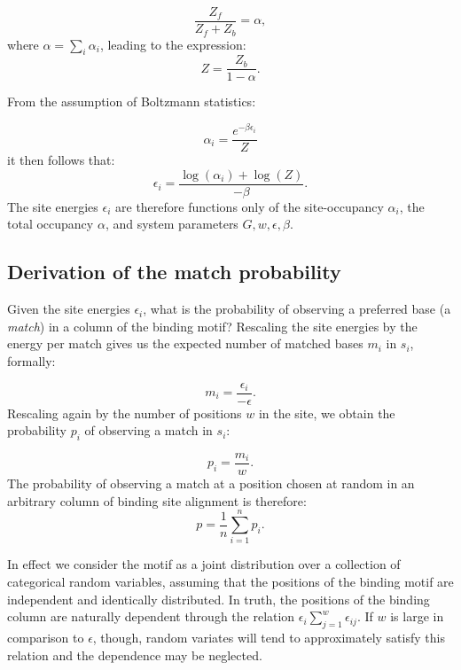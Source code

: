 \documentclass{article}
\begin{document}
\begin{equation}
  \label{eq:Zb_Zf}
  \frac{Z_f}{Z_f+Z_b} = \alpha,
\end{equation}
where $\alpha = \sum_i\alpha_i$, leading to the expression:
\begin{equation}
  \label{eq:Z}
  Z = \frac{Z_b}{1-\alpha}.
\end{equation}

From the assumption of Boltzmann statistics:

\begin{equation}
  \label{eq:boltzmann}
  \alpha_i = \frac{e^{-\beta\epsilon_i}}{Z}
\end{equation}
it then follows that:
\begin{equation}
  \label{eq:boltzmann}
   \epsilon_i= \frac{\log(\alpha_i) + \log(Z)}{-\beta}.
\end{equation}
The site energies $\epsilon_i$ are therefore functions only of the
site-occupancy $\alpha_i$, the total occupancy $\alpha$, and system
parameters $G,w,\epsilon,\beta$.
\subsection{Derivation of the match probability}
Given the site energies $\epsilon_i$, what is the probability of
observing a preferred base (a \textit{match}) in a column of the
binding motif?  Rescaling the site energies by the energy per match
gives us the expected number of matched bases $m_i$ in $s_i$, formally:

\begin{equation}
  \label{eq:expected_matches}
  m_i = \frac{\epsilon_i}{-\epsilon}.
\end{equation}
Rescaling again by the number of positions $w$ in the site, we obtain
the probability $p_i$ of observing a match in $s_i$:

\begin{equation}
  \label{eq:match_prob}
  p_i=  \frac{m_i}{w}.
\end{equation}
The probability of observing a match at a position chosen at random in
an arbitrary column of binding site alignment is therefore:
\begin{equation}
  \label{eq:p}
  p = \frac{1}{n}\sum_{i=1}^np_i.
\end{equation}

In effect we consider the motif as a joint distribution over a
collection of categorical random variables, assuming that the
positions of the binding motif are independent and identically
distributed.  In truth, the positions of the binding column are
naturally dependent through the relation $\epsilon_i
\sum_{j=1}^w\epsilon_{ij}$.  If $w$ is large in comparison to
$\epsilon$, though, random variates will tend to approximately
satisfy this relation and the dependence may be neglected.
\end{document}
